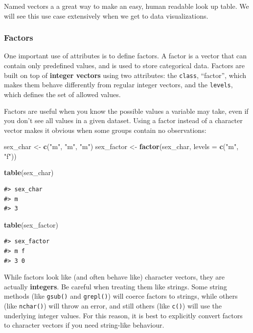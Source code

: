 \documentclass[]{book}
\newenvironment{Shaded}{\begin{snugshade}}{\end{snugshade}}
\newcommand{\KeywordTok}[1]{\textcolor[rgb]{0.13,0.29,0.53}{\textbf{#1}}}
\newcommand{\DataTypeTok}[1]{\textcolor[rgb]{0.13,0.29,0.53}{#1}}
\newcommand{\StringTok}[1]{\textcolor[rgb]{0.31,0.60,0.02}{#1}}
\newcommand{\NormalTok}[1]{#1}
\theoremstyle{definition}
\theoremstyle{definition}
\theoremstyle{definition}
\theoremstyle{remark}
\begin{document}
Named vectors a a great way to make an easy, human readable look up
table. We will see this use case extensively when we get to data
visualizations.

\subsubsection{Factors}\label{factors}

One important use of attributes is to define factors. A factor is a
vector that can contain only predefined values, and is used to store
categorical data. Factors are built on top of \textbf{integer vectors}
using two attributes: the \texttt{class}, ``factor'', which makes them
behave differently from regular integer vectors, and the
\texttt{levels}, which defines the set of allowed values.

Factors are useful when you know the possible values a variable may
take, even if you don't see all values in a given dataset. Using a
factor instead of a character vector makes it obvious when some groups
contain no observations:

\begin{Shaded}
\begin{Highlighting}[]
\NormalTok{sex_char <-}\StringTok{ }\KeywordTok{c}\NormalTok{(}\StringTok{"m"}\NormalTok{, }\StringTok{"m"}\NormalTok{, }\StringTok{"m"}\NormalTok{)}
\NormalTok{sex_factor <-}\StringTok{ }\KeywordTok{factor}\NormalTok{(sex_char, }\DataTypeTok{levels =} \KeywordTok{c}\NormalTok{(}\StringTok{"m"}\NormalTok{, }\StringTok{"f"}\NormalTok{))}

\KeywordTok{table}\NormalTok{(sex_char)}
\end{Highlighting}
\end{Shaded}

\begin{verbatim}
#> sex_char
#> m 
#> 3
\end{verbatim}

\begin{Shaded}
\begin{Highlighting}[]
\KeywordTok{table}\NormalTok{(sex_factor)}
\end{Highlighting}
\end{Shaded}

\begin{verbatim}
#> sex_factor
#> m f 
#> 3 0
\end{verbatim}

While factors look like (and often behave like) character vectors, they
are actually \textbf{integers}. Be careful when treating them like
strings. Some string methods (like \texttt{gsub()} and \texttt{grepl()})
will coerce factors to strings, while others (like \texttt{nchar()})
will throw an error, and still others (like \texttt{c()}) will use the
underlying integer values. For this reason, it is best to explicitly
convert factors to character vectors if you need string-like behaviour.
\end{document}
